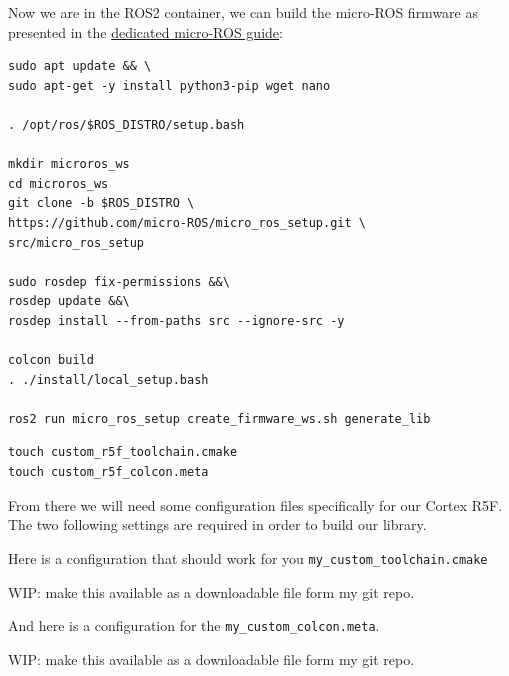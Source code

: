 \documentclass[10pt]{article}
\begin{document}
Now we are in the ROS2 container, we can build the micro-ROS firmware as presented in the \href{https://micro.ros.org/docs/tutorials/advanced/create\_custom\_static\_library}{dedicated micro-ROS guide}:
\begin{tcolorbox}
\begin{verbatim}
sudo apt update && \
sudo apt-get -y install python3-pip wget nano

. /opt/ros/$ROS_DISTRO/setup.bash

mkdir microros_ws
cd microros_ws
git clone -b $ROS_DISTRO \
https://github.com/micro-ROS/micro_ros_setup.git \
src/micro_ros_setup

sudo rosdep fix-permissions &&\
rosdep update &&\
rosdep install --from-paths src --ignore-src -y

colcon build
. ./install/local_setup.bash

ros2 run micro_ros_setup create_firmware_ws.sh generate_lib
\end{verbatim}
\end{tcolorbox}


\begin{tcolorbox}
\begin{verbatim}
touch custom_r5f_toolchain.cmake
touch custom_r5f_colcon.meta
\end{verbatim}
\end{tcolorbox}

From there we will need some configuration files specifically for
our Cortex R5F. The two following settings are required in order to build our library.


Here is a configuration that should work for you \verb|my_custom_toolchain.cmake|

WIP: make this available as a downloadable file form my git repo.
\begin{tcolorbox}

\end{tcolorbox}

And here is a configuration for the \verb|my_custom_colcon.meta|.

WIP: make this available as a downloadable file form my git repo.
\begin{tcolorbox}

\end{tcolorbox}
\end{document}
